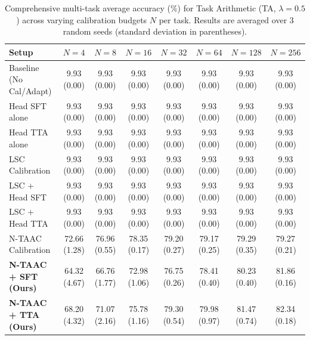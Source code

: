 \begin{table}[ht]
\centering
\caption{Comprehensive multi-task average accuracy (\%) for Task Arithmetic (TA, $\lambda=0.5$) across varying calibration budgets $N$ per task. Results are averaged over 3 random seeds (standard deviation in parentheses).}
\label{tab:appendix_ta_05}
\vskip 0.15in
\begin{sc}
\begin{scriptsize}
\setlength{\tabcolsep}{3pt}
\begin{tabular}{lccccccc}
\toprule
Setup & $N=4$ & $N=8$ & $N=16$ & $N=32$ & $N=64$ & $N=128$ & $N=256$ \\
\midrule
Baseline (No Cal/Adapt) & 9.93 (0.00) & 9.93 (0.00) & 9.93 (0.00) & 9.93 (0.00) & 9.93 (0.00) & 9.93 (0.00) & 9.93 (0.00) \\
Head SFT alone & 9.93 (0.00) & 9.93 (0.00) & 9.93 (0.00) & 9.93 (0.00) & 9.93 (0.00) & 9.93 (0.00) & 9.93 (0.00) \\
Head TTA alone & 9.93 (0.00) & 9.93 (0.00) & 9.93 (0.00) & 9.93 (0.00) & 9.93 (0.00) & 9.93 (0.00) & 9.93 (0.00) \\
LSC Calibration & 9.93 (0.00) & 9.93 (0.00) & 9.93 (0.00) & 9.93 (0.00) & 9.93 (0.00) & 9.93 (0.00) & 9.93 (0.00) \\
LSC + Head SFT & 9.93 (0.00) & 9.93 (0.00) & 9.93 (0.00) & 9.93 (0.00) & 9.93 (0.00) & 9.93 (0.00) & 9.93 (0.00) \\
LSC + Head TTA & 9.93 (0.00) & 9.93 (0.00) & 9.93 (0.00) & 9.93 (0.00) & 9.93 (0.00) & 9.93 (0.00) & 9.93 (0.00) \\
N-TAAC Calibration & 72.66 (1.28) & 76.96 (0.55) & 78.35 (0.17) & 79.20 (0.27) & 79.17 (0.25) & 79.29 (0.35) & 79.27 (0.21) \\
\textbf{N-TAAC + SFT (Ours)} & 64.32 (4.67) & 66.76 (1.77) & 72.98 (1.06) & 76.75 (0.26) & 78.41 (0.40) & 80.23 (0.40) & 81.86 (0.16) \\
\textbf{N-TAAC + TTA (Ours)} & 68.20 (4.32) & 71.07 (2.16) & 75.78 (1.16) & 79.30 (0.54) & 79.98 (0.97) & 81.47 (0.74) & 82.34 (0.18) \\
\bottomrule
\end{tabular}
\end{scriptsize}
\end{sc}
\end{table}

